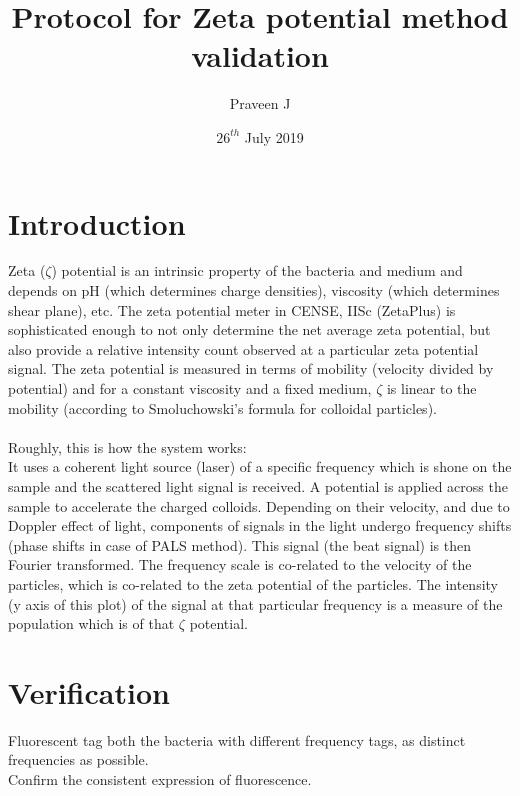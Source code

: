 \documentclass [a4paper,11pt]{article}
\begin{document}
\title{Protocol for Zeta potential method validation}
\author{Praveen J}
\date{$26^{th}$ July 2019}
\maketitle
\section{Introduction}
Zeta ($\zeta$) potential is an intrinsic property of the bacteria and medium and depends on pH (which determines charge densities), viscosity (which determines shear plane), etc. The zeta potential meter in CENSE, IISc (ZetaPlus) is sophisticated enough to not only determine the net average zeta potential, but also provide a relative intensity count observed at a particular zeta potential signal. The zeta potential is measured in terms of mobility (velocity divided by potential) and for a constant viscosity and a fixed medium, $\zeta$ is linear to the mobility (according to Smoluchowski’s formula for colloidal particles).\\ \\
Roughly, this is how the system works:\\
It uses a coherent light source (laser) of a specific frequency which is shone on the sample and the scattered light signal is received. A potential is applied across the sample to accelerate the charged colloids. Depending on their velocity, and due to Doppler effect of light, components of signals in the light undergo frequency shifts (phase shifts in case of PALS method). This signal (the beat signal) is then Fourier transformed. The frequency scale is co-related to the velocity of the particles, which is co-related to the zeta potential of the particles. The intensity (y axis of this plot) of the signal at that particular frequency is a measure of the population which is of that $\zeta$ potential.
\section{Verification}
Fluorescent tag both the bacteria with different frequency tags, as distinct frequencies as possible.\\
Confirm the consistent expression of fluorescence.
\end{document}
